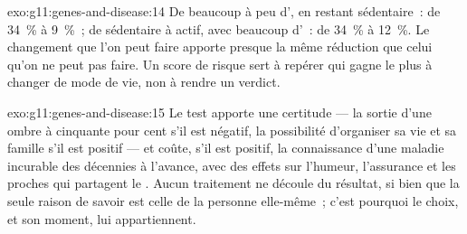 \begin{solution}{exo:g11:genes-and-disease:14}
De beaucoup à peu d', en restant sédentaire~: de 34~\% à 9~\%~;
de sédentaire à actif, avec beaucoup d'~: de 34~\% à 12~\%. Le
changement que l'on peut faire apporte presque la même réduction que
celui qu'on ne peut pas faire. Un score de risque sert à repérer qui
gagne le plus à changer de mode de vie, non à rendre un verdict.
\end{solution}

\begin{solution}{exo:g11:genes-and-disease:15}
Le test apporte une certitude --- la sortie d'une ombre à cinquante
pour cent s'il est négatif, la possibilité d'organiser sa vie et sa
famille s'il est positif --- et coûte, s'il est positif, la
connaissance d'une maladie incurable des décennies à l'avance, avec des
effets sur l'humeur, l'assurance et les proches qui partagent le .
Aucun traitement ne découle du résultat, si bien que la seule raison de
savoir est celle de la personne elle-même~; c'est pourquoi le choix, et
son moment, lui appartiennent.
\end{solution}

